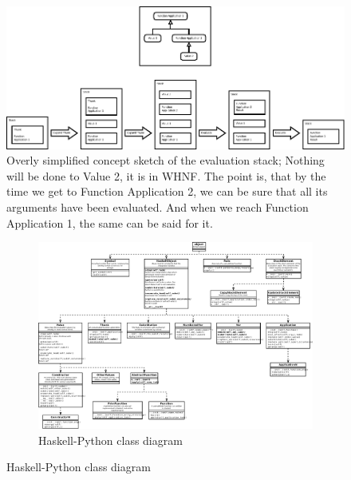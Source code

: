 \begin{figure}[H]
\centering
\includegraphics[width=\textwidth]{../diags/eval-stack.pdf}

\caption{Overly simplified concept sketch of the evaluation stack; 
Nothing will be done to Value 2, it is
in WHNF. The point is, that by the time we get to Function Application 2, we can be
sure that all its arguments have been evaluated. And when we reach Function Application 1,
the same can be said for it.}
\label{fig:classdia}

\end{figure}


\begin{figure}
\begin{figure}[H]
\centering
\includegraphics[angle=270, width=\textheight]{../diags/core-interp.pdf}

\caption{Haskell-Python class diagram}
\label{fig:classdia}

\end{figure}
\end{figure}

